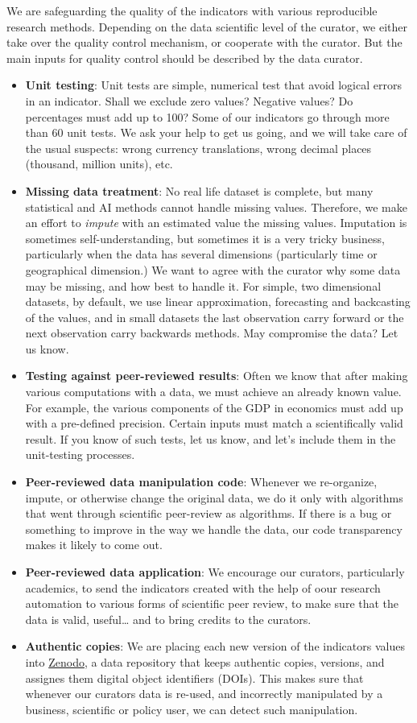 \documentclass[
  a4paper,
  openany, a4paper, oneside]{book}
\begin{document}
We are safeguarding the quality of the indicators with various reproducible research methods. Depending on the data scientific level of the curator, we either take over the quality control mechanism, or cooperate with the curator. But the main inputs for quality control should be described by the data curator.

\begin{itemize}
\item
  \textbf{Unit testing}: Unit tests are simple, numerical test that avoid logical errors in an indicator. Shall we exclude zero values? Negative values? Do percentages must add up to 100? Some of our indicators go through more than 60 unit tests. We ask your help to get us going, and we will take care of the usual suspects: wrong currency translations, wrong decimal places (thousand, million units), etc.
\item
  \textbf{Missing data treatment}: No real life dataset is complete, but many statistical and AI methods cannot handle missing values. Therefore, we make an effort to \emph{impute} with an estimated value the missing values. Imputation is sometimes self-understanding, but sometimes it is a very tricky business, particularly when the data has several dimensions (particularly time or geographical dimension.) We want to agree with the curator why some data may be missing, and how best to handle it. For simple, two dimensional datasets, by default, we use linear approximation, forecasting and backcasting of the values, and in small datasets the last observation carry forward or the next observation carry backwards methods. May compromise the data? Let us know.
\item
  \textbf{Testing against peer-reviewed results}: Often we know that after making various computations with a data, we must achieve an already known value. For example, the various components of the GDP in economics must add up with a pre-defined precision. Certain inputs must match a scientifically valid result. If you know of such tests, let us know, and let's include them in the unit-testing processes.
\item
  \textbf{Peer-reviewed data manipulation code}: Whenever we re-organize, impute, or otherwise change the original data, we do it only with algorithms that went through scientific peer-review as algorithms. If there is a bug or something to improve in the way we handle the data, our code transparency makes it likely to come out.
\item
  \textbf{Peer-reviewed data application}: We encourage our curators, particularly academics, to send the indicators created with the help of oour research automation to various forms of scientific peer review, to make sure that the data is valid, useful\ldots{} and to bring credits to the curators.
\item
  \textbf{Authentic copies}: We are placing each new version of the indicators values into \href{https://zenodo.org/}{Zenodo}, a data repository that keeps authentic copies, versions, and assignes them digital object identifiers (DOIs). This makes sure that whenever our curators data is re-used, and incorrectly manipulated by a business, scientific or policy user, we can detect such manipulation.
\end{itemize}
\end{document}
